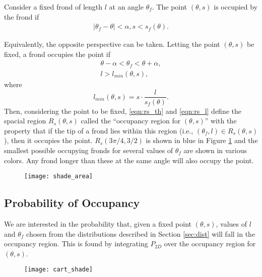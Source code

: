 Consider a fixed frond of length $l$ at an angle $\theta_f$. The point
$(\theta,s)$ is occupied by the frond if
\begin{align*}
	\left|\theta_f - \theta \right| < \alpha,
	s < s_f(\theta).
\end{align*}

Equivalently, the opposite perspective can be taken.
Letting the point $(\theta,s)$ be fixed, a frond occupies the point if
\begin{align}
	\theta - \alpha < \theta_f < \theta + \alpha,
	\label{eqn:rs_th} \\
	l > l_{min}(\theta,s),
	\label{eqn:rs_l}
\end{align}
where
\begin{equation*}
	l_{min}(\theta,s) = s \cdot \frac{l}{s_f(\theta)}.
\end{equation*}
Then, considering the point to be fixed, \eqref{eqn:rs_th} and \eqref{eqn:rs_l} define the spacial region $R_s(\theta,s)$ called the ``occupancy region for $(\theta,s)$'' with the property that if the tip of a frond lies within this region (i.e., $(\theta_f,l) \in R_s(\theta,s)$), then it occupies the point.
$R_s(3\pi/4,3/2)$ is shown in blue in Figure \ref{fig:shade_area} and the smallest possible occupying fronds for several values of $\theta_f$ are shown in various colors.
Any frond longer than these at the same angle will also occupy the point.

\begin{figure}[h]
	\centering
	\texttt{[image: shade\_area]}
	\label{fig:shade_area}
\end{figure}

\subsection{Probability of Occupancy}
We are interested in the probability that, given a fixed point $(\theta,s)$, values of $l$ and $\theta_f$ chosen from the distributions described in Section \ref{sec:dist} will fall in the occupancy region.
This is found by integrating $P_{2D}$ over the occupancy region for $(\theta,s)$.

\begin{figure}[h]
	\centering
	\texttt{[image: cart\_shade]}
	\label{fig:cart_shade}
\end{figure}

